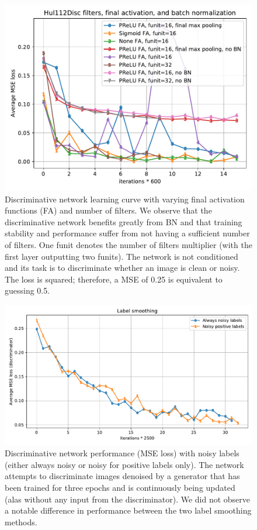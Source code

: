 \begin{figure}[!htbp]
\centering
\includegraphics[width=1\linewidth]{gfx/graphs/hul112disc-activ.pdf}
\caption[Discriminative network learning curve with different final activation functions and number of filters]{Discriminative network learning curve with varying final activation functions (FA) and number of filters. We observe that the discriminative network benefits greatly from \ac{BN} and that training stability and performance suffer from not having a sufficient number of filters. One funit denotes the number of filters multiplier (with the first layer outputting two funits). The network is not conditioned and its task is to discriminate whether an image is clean or noisy. The loss is squared; therefore, a \ac{MSE} of 0.25 is equivalent to guessing 0.5.}
\label{fig:hul112disc-activ}
\end{figure}

\begin{figure}[!htbp]
\centering
\includegraphics[width=1\linewidth]{gfx/graphs/label-smoothing.pdf}
\caption[Discriminative network performance with noisy labels (always noisy or noisy for positive labels only)]{Discriminative network performance (\ac{MSE} loss) with noisy labels (either always noisy or noisy for positive labels only). The network attempts to discriminate images denoised by a generator that has been trained for three epochs and is continuously being updated (alas without any input from the discriminator). We did not observe a notable difference in performance between the two label smoothing methods.}
\label{fig:label-smoothing}
\end{figure}

